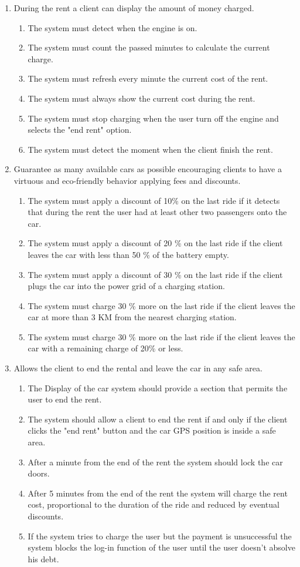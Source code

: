 \begin{enumerate}
\item During the rent a client can display the amount of money charged.
\begin{enumerate}
\item The system must detect when the engine is on.
\item The system must count the passed minutes to calculate the current charge.
\item The system must refresh every minute the current cost of the rent.
\item The system must always show the current cost during the rent.
\item The system must stop charging when the user turn off the engine and selects the "end rent" option.
\item The system must detect the moment when the client finish the rent.
\end{enumerate}

\item Guarantee as many available cars as possible encouraging clients to have a virtuous and eco-friendly behavior applying fees and discounts.
\begin{enumerate}
\item The system must apply  a discount of 10\% on the last ride if it detects that during the rent the user had at least other two passengers onto the car.
\item The system must apply a discount of 20 \% on the last ride if the client leaves the car with less than 50 \% of the battery empty.
\item The system must apply a discount of 30 \% on the last ride if the client plugs the car into the power grid of a charging station.
\item The system must charge 30 \% more on the last ride if the client leaves the car at more than 3 KM from the nearest charging station.
\item The system must charge 30 \% more on the last ride if the client leaves the car with a remaining charge of 20\% or less.
\end{enumerate}
	

\item Allows the client to end the rental and leave the car in any safe area.
\begin{enumerate}
\item The Display of the car system should provide a section that permits the user to end the rent.
\item The system should allow a client to end the rent if and only if the client clicks the "end rent" button and the car GPS position is inside a safe area.
\item After a minute from the end of the rent the system should lock the car doors.
\item After 5 minutes from the end of the rent the system will charge the rent cost, proportional to the duration of the ride and reduced by eventual discounts.
\item If the system tries to charge the user but the payment is unsuccessful the system blocks the log-in function of the user until the user doesn't absolve his debt. 
\end{enumerate}


\end{enumerate}
